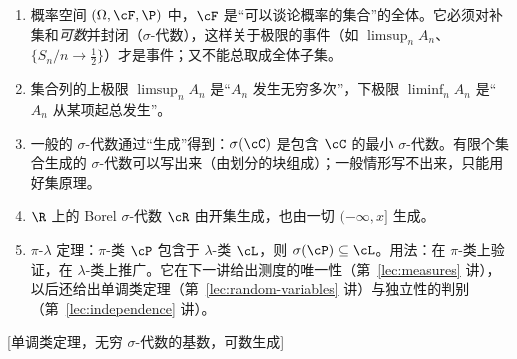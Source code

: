 \begin{enumerate}
\item 概率空间 $(\Omega,\cF,\P)$ 中，$\cF$ 是“可以谈论概率的集合”的全体。它必须对补集和\emph{可数}并封闭（$\sigma$-代数），这样关于极限的事件（如 $\limsup_nA_n$、$\{S_n/n\to\frac12\}$）才是事件；又不能总取成全体子集。
\item 集合列的上极限 $\limsup_nA_n$ 是“$A_n$ 发生无穷多次”，下极限 $\liminf_nA_n$ 是“$A_n$ 从某项起总发生”。
\item 一般的 $\sigma$-代数通过“生成”得到：$\sigma(\cC)$ 是包含 $\cC$ 的最小 $\sigma$-代数。有限个集合生成的 $\sigma$-代数可以写出来（由划分的块组成）；一般情形写不出来，只能用好集原理。
\item $\R$ 上的 Borel $\sigma$-代数 $\cR$ 由开集生成，也由一切 $(-\infty,x]$ 生成。
\item $\pi$-$\lambda$ 定理：$\pi$-类 $\cP$ 包含于 $\lambda$-类 $\cL$，则 $\sigma(\cP)\subseteq\cL$。用法：在 $\pi$-类上验证，在 $\lambda$-类上推广。它在下一讲给出测度的唯一性（第~\ref{lec:measures} 讲），以后还给出单调类定理（第~\ref{lec:random-variables} 讲）与独立性的判别（第~\ref{lec:independence} 讲）。
\end{enumerate}

[单调类定理，无穷 \texorpdfstring{$\sigma$}{σ}-代数的基数，可数生成]
\label{hw:set-systems}



